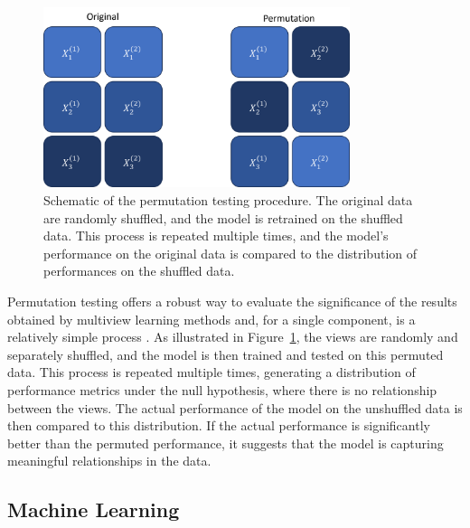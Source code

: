 \begin{figure}
    \centering
    \includegraphics[width=0.8\textwidth]{figures/permutation_test.png}
    \caption{Schematic of the permutation testing procedure. The original data are randomly shuffled, and the model is retrained on the shuffled data. This process is repeated multiple times, and the model's performance on the original data is compared to the distribution of performances on the shuffled data.}
    \label{fig:statistical-inference}
\end{figure}

Permutation testing offers a robust way to evaluate the significance of the results obtained by multiview learning methods and, for a single component, is a relatively simple process \citep{winkler2020permutation}.
As illustrated in Figure~\ref{fig:statistical-inference}, the \gls{views} are randomly and separately shuffled, and the model is then trained and tested on this permuted data.
This process is repeated multiple times, generating a distribution of performance metrics under the null hypothesis, where there is no relationship between the views.
The actual performance of the model on the unshuffled data is then compared to this distribution.
If the actual performance is significantly better than the permuted performance, it suggests that the model is capturing meaningful relationships in the data.

\subsection{Machine Learning}

